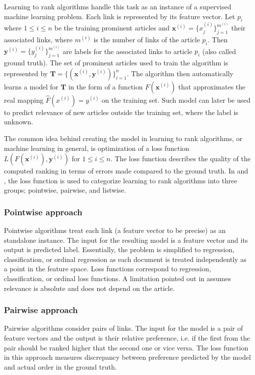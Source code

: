 Learning to rank algorithms handle this task as an instance of a supervised machine learning problem. Each link is represented by its feature vector. Let $p_i$ where $1 \le i \le n$ be the training prominent articles and $\mathbf{x}^{(i)} = \{x_{j}^{(i)}\}_{j = 1}^{m^{(i)}}$ their associated links, where $m^{(i)}$ is the number of links of the article $p_i$. Then $\mathbf{y}^{(i)} = \{y_{j}^{(i)}\}_{j = 1}^{m^{(i)}}$ are labels for the associated links to article $p_i$ (also called ground truth). The set of prominent articles used to train the algorithm is represented by $\mathbf{T} = \{(\mathbf{x}^{(i)},\mathbf{y}^{(i)} )\}_{i = 1}^{n}$. The algorithm then automatically learns a model for $\mathbf{T}$ in the form of a function $F(\mathbf{x}^{(i)})$ that approximates the real mapping $\hat{F}(x^{(i)}) = y^{(i)}$ on the training set. Such model can later be used to predict relevance of new articles outside the training set, where the label is unknown.

The common idea behind creating the model in learning to rank algorithms, or machine learning in general, is optimization of a loss function $L(F(\mathbf{x}^{(i)}), \mathbf{y}^{(i)})$ for $1 \le i \le n$. The loss function describes the quality of the computed ranking in terms of errors made compared to the ground truth. In \cite{LTR4IR} and \cite{li}, the loss function is used to categorize learning to rank algorithms into three groups; pointwise, pairwise, and listwise.

\subsubsection{Pointwise approach}
Pointwise algorithms treat each link (a feature vector to be precise) as an standalone instance. The input for the resulting model is a feature vector and its output is predicted label. Essentially, the problem is simplified to regression, classification, or  ordinal regression as each document is treated independently as a point in the feature space. Loss functions correspond to  regression, classification, or ordinal loss functions. A limitation pointed out in \cite{LTR4IR} assumes relevance is absolute and does not depend on the article.
%
%
%

\subsubsection{Pairwise approach}
Pairwise algorithms consider pairs of links. The input for the model is a pair of feature vectors and the output is their relative preference, i.e. if the first from the pair should be ranked higher that the second one or vice versa. The loss function in this approach measures discrepancy between preference predicted by the model and actual order in the ground truth.

